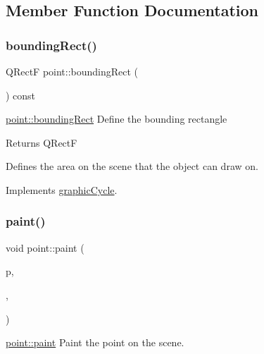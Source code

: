 \subsection{Member Function Documentation}
\mbox{\label{classpoint_a91a81fc826052833e19e9d39ef3849d9}} 
\subsubsection{\texorpdfstring{bounding\+Rect()}{boundingRect()}}
{\footnotesize\ttfamily Q\+RectF point\+::bounding\+Rect (\begin{DoxyParamCaption}{ }\end{DoxyParamCaption}) const\hspace{0.3cm}{\ttfamily [virtual]}}



\mbox{\hyperlink{classpoint_a91a81fc826052833e19e9d39ef3849d9}{point\+::bounding\+Rect}} Define the bounding rectangle 

\begin{DoxyReturn}{Returns}
Q\+RectF
\end{DoxyReturn}
Defines the area on the scene that the object can draw on. 

Implements \mbox{\hyperlink{classgraphic_cycle}{graphic\+Cycle}}.

\mbox{\label{classpoint_a5e75bab386500018e5d068c920ed0e66}} 
\subsubsection{\texorpdfstring{paint()}{paint()}}
{\footnotesize\ttfamily void point\+::paint (\begin{DoxyParamCaption}\item[{Q\+Painter $\ast$}]{p,  }\item[{const Q\+Style\+Option\+Graphics\+Item $\ast$}]{,  }\item[{Q\+Widget $\ast$}]{ }\end{DoxyParamCaption})\hspace{0.3cm}{\ttfamily [virtual]}}



\mbox{\hyperlink{classpoint_a5e75bab386500018e5d068c920ed0e66}{point\+::paint}} Paint the point on the scene. 


